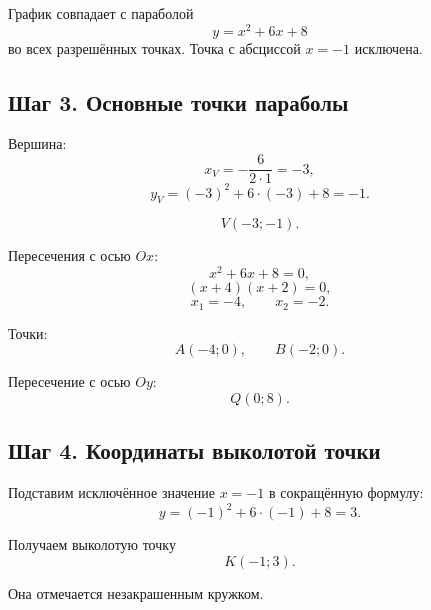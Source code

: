 \documentclass[a4paper,12pt]{article}
\begin{document}
График совпадает с параболой
\[
  y=x^2+6x+8
\]
во всех разрешённых точках. Точка с абсциссой \(x=-1\) исключена.

\subsection*{Шаг 3. Основные точки параболы}

Вершина:
\[
  x_V=-\frac{6}{2\cdot 1}=-3,
\]
\[
  y_V=(-3)^2+6\cdot(-3)+8=-1.
\]

\[
  V(-3;-1).
\]

Пересечения с осью \(Ox\):
\[
  x^2+6x+8=0,
\]
\[
  (x+4)(x+2)=0,
\]
\[
  x_1=-4,
  \qquad
  x_2=-2.
\]

Точки:
\[
  A(-4;0),
  \qquad
  B(-2;0).
\]

Пересечение с осью \(Oy\):
\[
  Q(0;8).
\]

\subsection*{Шаг 4. Координаты выколотой точки}

Подставим исключённое значение \(x=-1\) в сокращённую формулу:
\[
  y=(-1)^2+6\cdot(-1)+8=3.
\]

Получаем выколотую точку
\[
  \boxed{K(-1;3)}.
\]

Она отмечается незакрашенным кружком.
\end{document}
